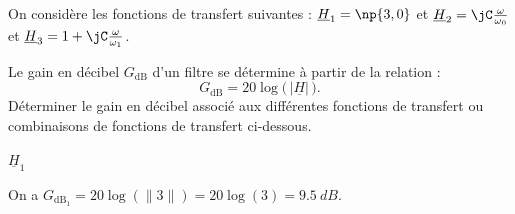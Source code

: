 



\hauteurLargeurCadreReponse		{6mm}{5cm}
\initialisationEntrainement

On considère les fonctions de transfert suivantes : 
$\underline{H}_1=\np{3,0}$ et  $\underline{H}_2=\jC \frac{ \omega}{\omega_0}$ et $\underline{H}_3=1+ \jC \frac{ \omega}{\omega_1}$.


Le gain en décibel $G_{\text{dB}}$ d'un filtre se détermine à partir de la relation : 
\[
	G_{\text{dB}}= 20 \log\big(\, \left | \underline{H}\right|\,  \big).
\]
Déterminer le gain en décibel associé aux différentes fonctions de transfert ou combinaisons de fonctions de transfert ci-dessous.

\debutEntrainement


\begin{enonce}
	$\underline{H}_1$
\end{enonce}


\begin{corrige}
On a $G_{\text{dB}_{1}}=20\log\left(\lVert 3  \rVert \right)=20\log\left( 3  \right)=\SI{9,5}{dB}$.
\end{corrige}

